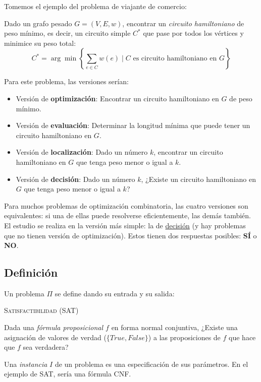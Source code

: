 \documentclass[a4paper]{report}
\begin{document}
Tomemos el ejemplo del problema de viajante de comercio:

\begin{problema}
    Dado un grafo pesado $G = (V, E, w)$, encontrar un \textit{circuito hamiltoniano} de peso mínimo, es decir, un circuito simple $C^*$ que pase por todos los vértices y minimice su peso total:
        $$C^* = \arg\min\left\{\sum_{e \in C} w(e) \mid C \text{ es circuito hamiltoniano en $G$}\right\}$$
\end{problema}

Para este problema, las versiones serían:
\begin{itemize}
    \item Versión de \textbf{optimización}: Encontrar un circuito hamiltoniano en $G$ de peso mínimo.
    \item Versión de \textbf{evaluación}: Determinar la longitud mínima que puede tener un circuito hamiltoniano en $G$.
    \item Versión de \textbf{localización}: Dado un número $k$, encontrar un circuito hamiltoniano en $G$ que tenga peso menor o igual a $k$.
    \item Versión de \textbf{decisión}: Dado un número $k$, ¿Existe un circuito hamiltoniano en $G$ que tenga peso menor o igual a $k$?
\end{itemize}

Para muchos problemas de optimización combinatoria, las cuatro versiones son equivalentes: si una de ellas puede resolverse eficientemente, las demás también. El estudio se realiza en la versión más simple: la de \underline{decisión} (y hay problemas que no tienen versión de optimización). Estos tienen dos respuestas posibles: \textbf{SÍ} o \textbf{NO}.

\subsection{Definición}

Un problema $\Pi$ se define dando su entrada y su salida:
\begin{problema}
    \textsc{Satisfactibilidad (SAT)}
    \medskip

    Dada una \textit{fórmula proposicional $f$} en forma normal conjuntiva, ¿Existe una asignación de valores de verdad ($\{True, False\}$) a las proposiciones de $f$ que hace que $f$ sea verdadera?
\end{problema}

Una \textit{instancia} $I$ de un problema es una especificación de sus parámetros. En el ejemplo de SAT, sería una fórmula CNF.
\end{document}
